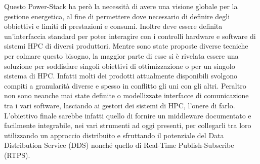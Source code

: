 Questo Power-Stack ha però la necessità di avere una visione globale per la gestione energetica, al fine di permettere dove necessario di definire degli obbiettivi e limiti di prestazioni e consumi. Inoltre deve essere definita un'interfaccia standard per poter interagire con i controlli hardware e software di sistemi HPC di diversi produttori.
Mentre sono state proposte diverse tecniche per colmare questo bisogno, %
la maggior parte di esse si è rivelata essere una soluzione per soddisfare singoli obiettivi di ottimizzazione o per un singolo sistema di HPC. Infatti molti dei prodotti attualmente disponibili svolgono compiti a granularità diverse e spesso in conflitto gli uni con gli altri. Peraltro non sono neanche mai state definite o modellizzate interfacce di comunicazione tra i vari software, lasciando ai gestori dei sistemi di HPC, l'onere di farlo.
L'obiettivo finale sarebbe infatti quello di fornire un middleware documentato e facilmente integrabile, nei vari strumenti ad oggi presenti, per collegarli tra loro utilizzando un approccio distribuito e sfruttando il potenziale del Data Distribution Service (DDS) %
nonché quello di \gls{Real-Time} Publish-Subscribe (RTPS).


